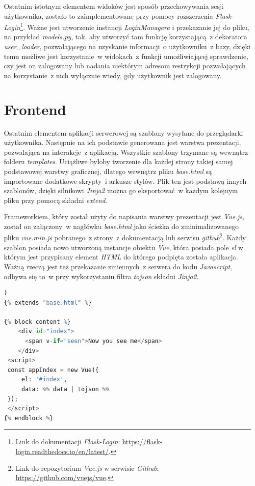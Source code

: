 Ostatnim istotnym elementem widoków jest sposób przechowywania sesji użytkownika, zostało to zaimplementowane przy pomocy rozszerzenia \textit{Flask-Login}\footnote{Link do dokumentacji \textit{Flask-Login}: \url{https://flask-login.readthedocs.io/en/latest/}.}. Ważne jest utworzenie instancji \textit{LoginManagera} i przekazanie jej do pliku, na przykład \textit{models.py}, tak, aby utworzyć tam funkcję korzystającą~z dekoratora \textit{user\_loader}, pozwalającego na uzyskanie informacji~o użytkowniku~z bazy, dzięki temu możliwe jest korzystanie~w widokach~z funkcji umożliwiającej sprawdzenie, czy jest on zalogowany lub nadania niektórym adresom restrykcji pozwalających na korzystanie~z nich wyłącznie wtedy, gdy użytkownik jest zalogowany\cite{Grinberg:2017}.

\section{Frontend}
Ostatnim elementem aplikacji serwerowej są szablony wysyłane do przeglądarki użytkownika. Następnie na ich podstawie generowana jest warstwa prezentacji, pozwalająca na interakcje~z aplikacją. Wszystkie szablony trzymane są wewnątrz folderu \textit{templates}. Uciążliwe byłoby tworzenie dla każdej strony takiej samej podstawowej warstwy graficznej, dlatego wewnątrz pliku \textit{base.html} są importowane dodatkowe skrypty~i arkusze stylów. Plik ten jest podstawą innych szablonów, dzięki silnikowi \textit{Jinja2} można go eksportować~w każdym kolejnym pliku przy pomocą składni \textit{extend}\cite{flask}.

Frameworkiem, który został użyty do napisania warstwy prezentacji jest \textit{Vue.js}, został on załączony~w nagłówku \textit{base.html} jako ścieżka do zminimalizowanego pliku \textit{vue.min.js} pobranego~z strony~z dokumentacją\cite{vuejs} lub serwisu \textit{github}\footnote{Link do repozytorium \textit{Vue.js} w serwisie \textit{Github}: \url{https://github.com/vuejs/vue}.}. Każdy szablon posiada nowo utworzoną instancje obiektu \textit{Vue}, która posiada pole \textit{el} w którym jest przypisany element \textit{HTML}\cite{vuejs} do którego podpięta została aplikacja. Ważną rzeczą jest też przekazanie zmiennych~z serwera do kodu \textit{Javascript}, odbywa się to~w przy wykorzystaniu filtra \textit{tojson} składni \textit{Jinja2}\cite{flask}.

\begin{lstlisting}[language=Python, caption={Przykładowy kod strony głównej przy użyciu \textit{Flaska} i \textit{Jinja2}.}, label={code:VueFlaskKod}])
{% extends "base.html" %}

{% block content %}
    <div id="index">
      <span v-if="seen">Now you see me</span>
    </div>
 <script>
 const appIndex = new Vue({
     el: '#index',
     data: %% data | tojson %%
 });
 </script>
{% endblock %}
\end{lstlisting}

